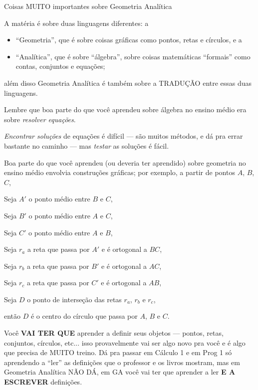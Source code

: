 \documentclass[oneside]{book}
\begin{document}
{
\setlength{\parindent}{0em}

 {Coisas MUITO importantes sobre Geometria Analítica}
}

\ssk

A matéria é sobre duas linguagens diferentes: a
%
\begin{itemize}
\item ``Geometria'', que é sobre coisas gráficas como pontos, retas e
  círculos, e a

\item ``Analítica'', que é sobre ``álgebra'', sobre coisas matemáticas
  ``formais'' como contas, conjuntos e equações;

\end{itemize}
%
além disso Geometria Analítica é também sobre a TRADUÇÃO entre essas
duas linguagens.

\msk

Lembre que boa parte do que você aprendeu sobre álgebra no ensino
médio era sobre {\sl resolver equações}.

{\sl Encontrar soluções} de equações é difícil --- são muitos métodos,
e dá pra errar bastante no caminho --- mas {\sl testar} as soluções é
fácil.

\msk

Boa parte do que você aprendeu (ou deveria ter aprendido) sobre
geometria no ensino médio envolvia construções gráficas; por exemplo,
a partir de pontos $A$, $B$, $C$,

Seja $A'$ o ponto médio entre $B$ e $C$,

Seja $B'$ o ponto médio entre $A$ e $C$,

Seja $C'$ o ponto médio entre $A$ e $B$,

Seja $r_a$ a reta que passa por $A'$ e é ortogonal a $BC$,

Seja $r_b$ a reta que passa por $B'$ e é ortogonal a $AC$,

Seja $r_c$ a reta que passa por $C'$ e é ortogonal a $AB$,

Seja $D$ o ponto de interseção das retas $r_a$, $r_b$ e $r_c$,

então $D$ é o centro do círculo que passa por $A$, $B$ e $C$.

\msk

Você {\bf VAI TER QUE} aprender a definir seus objetos --- pontos, retas,
conjuntos, círculos, etc... isso provavelmente vai ser algo novo pra
você e é algo que precisa de MUITO treino. Dá pra passar em Cálculo 1
e em Prog 1 só aprendendo a ``ler'' as definições que o professor e os
livros mostram, mas em Geometria Analítica NÃO DÁ, em GA você vai ter
que aprender a ler {\bf E A ESCREVER} definições.
\end{document}
